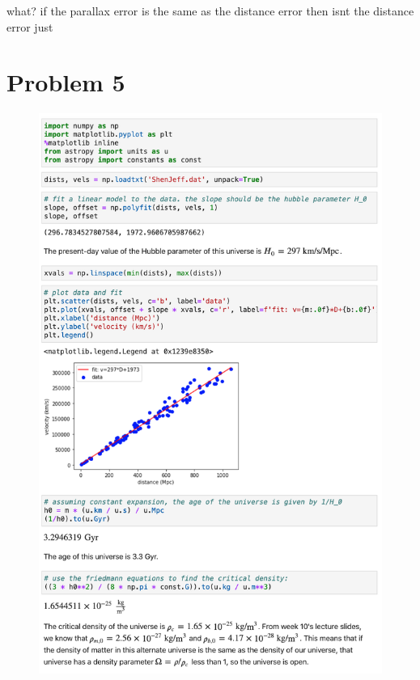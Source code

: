 \documentclass[11pt,letterpaper]{article}
\begin{document}
what? if the parallax error is the same as the distance error then isnt the distance error just 
\newpage

\section*{Problem 5}

\begin{figure}[!htbp]
    \centering
    \includegraphics[width=0.78\linewidth]{q5.png}
\end{figure}

\newpage
\end{document}
